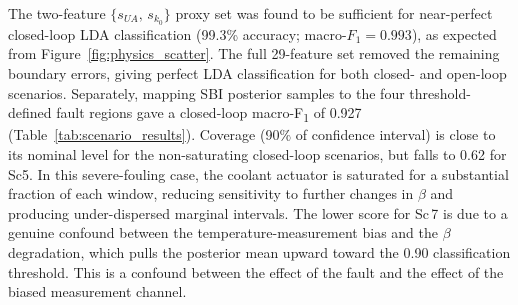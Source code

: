 \documentclass[aps,pre,twocolumn,superscriptaddress,floatfix]{revtex4-2}
\begin{document}
The two-feature $\{s_{U\!A},\,s_{k_0}\}$ proxy set was found to be sufficient for
near-perfect closed-loop LDA classification (99.3\% accuracy; macro-$F_1=0.993$), as expected from 
Figure~\ref{fig:physics_scatter}. The full
29-feature set removed the remaining boundary errors, giving perfect LDA classification for both
closed- and open-loop scenarios. Separately, mapping SBI posterior samples to the four
threshold-defined fault regions gave a closed-loop macro-F\textsubscript{1} of
0.927 (Table~\ref{tab:scenario_results}).
Coverage (90$\%$ of confidence interval) 
is close to its nominal level for the non-saturating closed-loop scenarios,
but falls to 0.62 for Sc5. In this severe-fouling case, the coolant actuator is saturated for a
substantial fraction of each window, reducing sensitivity to further changes in $\beta$ and 
producing under-dispersed marginal intervals.
The lower score for Sc\,7 is due to a genuine confound between the temperature-measurement
bias and the $\beta$ degradation, which pulls the posterior mean upward toward the 0.90 classification
threshold. This is a confound between the effect of the fault and the effect of the biased measurement channel. 
\end{document}
